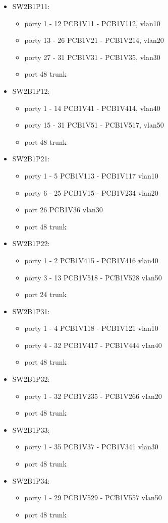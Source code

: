 \documentclass[a4paper, 12pt]{article}
\begin{document}
\begin{itemize}
\item SW2B1P11:
	\begin{itemize}
	\item porty 1 - 12 PCB1V11 - PCB1V112, vlan10 
	\item porty 13 - 26 PCB1V21 - PCB1V214, vlan20
	\item porty 27 - 31 PCB1V31 - PCB1V35, vlan30
	\item port 48 trunk
	\end{itemize}
\item SW2B1P12:
	\begin{itemize}
	\item porty 1 - 14 PCB1V41 - PCB1V414, vlan40
	\item porty 15 - 31 PCB1V51 - PCB1V517, vlan50
	\item port 48 trunk
	\end{itemize}
	
\item SW2B1P21:
	\begin{itemize}
	\item porty 1 - 5 PCB1V113 - PCB1V117 vlan10
	\item porty 6 - 25 PCB1V15 - PCB1V234 vlan20
	\item port 26 PCB1V36 vlan30
	\item port 48 trunk
	\end{itemize}
\item SW2B1P22:
	\begin{itemize}
	\item porty 1 - 2 PCB1V415 - PCB1V416 vlan40
	\item porty 3 - 13 PCB1V518 - PCB1V528 vlan50
	\item port 24 trunk
	\end{itemize}
\item SW2B1P31:
	\begin{itemize}
	\item porty 1 - 4 PCB1V118 - PCB1V121 vlan10
	\item porty 4 - 32 PCB1V417 - PCB1V444 vlan40
	\item port 48 trunk
	\end{itemize}
\item SW2B1P32:
	\begin{itemize}
	\item porty 1 - 32 PCB1V235 - PCB1V266 vlan20
	\item port 48 trunk
	\end{itemize}
\item SW2B1P33:
	\begin{itemize}
	\item porty 1 - 35 PCB1V37 - PCB1V341 vlan30
	\item port 48 trunk
	\end{itemize}
\item SW2B1P34:
	\begin{itemize}
	\item porty 1 - 29 PCB1V529 - PCB1V557 vlan50
	\item port 48 trunk
	\end{itemize}
	

\end{itemize}
\end{document}
